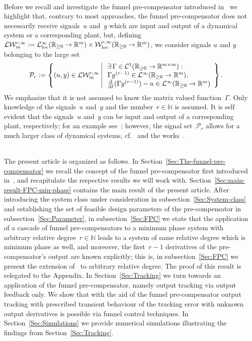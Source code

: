 \documentclass[ envcountsect, envcountsame]{svjour3}
\newcommand{\ddt}{\tfrac{\text{\normalfont d}}{\text{\normalfont d}t}}
\newcommand{\R}{\mathbb{R}}
\newcommand{\N}{\mathbb{N}}
\newcommand{\cC}{\mathcal{C}}
\newcommand{\cL}{\mathcal{L}}
\newcommand{\cP}{\mathcal{P}}
\newcommand{\cW}{\mathcal{W}}
\newcommand{\rp}{\mathbb{R}_{\geq 0}}
\begin{document}
\ \\
Before we recall and investigate the funnel pre-compensator introduced in~\cite{BergReis18b} we highlight that, contrary to most approaches, the funnel pre-compensator does not necessarily receive signals~$u$ and~$y$ which are input and output of a dynamical system or a corresponding plant, 
but, defining $\cL \cW_{m}^{r,\infty} := \cL_{\rm loc}^\infty(\rp \to \R^m) \times \cW_{\rm loc}^{r,\infty}(\rp \to \R^{m}) $, we consider signals $u$ and $y$ belonging to the large set
\begin{equation*}
\cP_r := 
\left\{ 
(u,y) \in \cL \cW_{m}^{r,\infty}  \ \vline \ 
\begin{array}{l}
\exists\, \Gamma \in \cC^1(\rp \to \R^{m \times m}): \\ 
\Gamma y^{(r-1)} \in \cL^\infty(\rp \to \R^m), \\
\ddt(\Gamma y^{(r-1)}) - u \in \cL^\infty(\rp \to \R^m)
\end{array}
\right\}.
\end{equation*}
We emphasize that it is not assumed to know the matrix valued function~$\Gamma$. 
Only knowledge of the signals~$u$ and~$y$ and the number~$ r \in \N$ is assumed.
It is self evident that the signals~$u$ and~$y$ can be input and output of a corresponding plant, respectively; for an example see~\cite{BergReis18b};
however, the signal set~$\cP_r$ allows for a much larger class of dynamical systems, cf.~\cite{BergLe18a} and the works~\cite{BergIlch14,IlchRyan02b}.


\ \\
The present article is organized as follows.
In Section~\ref{Sec:The-funnel-pre-compensator} we recall the concept of the funnel pre-compensator first introduced in~\cite{BergReis18b}, and recapitulate the respective results we will work with.
Section~\ref{Sec:main-result-FPC-min-phase} contains the main result of the present article. 
%
After introducing the system class under consideration in subsection~\ref{Sec:System-class} and establishing the set of feasible design parameters of the pre-compensator in subsection~\ref{Sec:Parameter}, 
%
in subsection~\ref{Sec:FPC} we state that the application of a cascade of funnel pre-compensators to a minimum phase system with arbitrary relative degree~$r \in \N$ leads to a system of same relative degree which is minimum phase as well, and moreover, the first~$r-1$ derivatives of the pre-compensator's output are known explicitly; this is, in subsection~\ref{Sec:FPC} we  present the extension of~\cite[Thm. 2]{BergReis18b} to arbitrary relative degree.
The proof of this result is relegated to the Appendix.
In Section~\ref{Sec:Tracking} we turn towards an application of the funnel pre-compensator, namely output tracking via output feedback only.
We show that with the aid of the funnel pre-compensator output tracking with prescribed transient behaviour of the tracking error with unknown output derivatives is possible via funnel control techniques.
In Section~\ref{Sec:Simulations} we provide numerical simulations illustrating the findings from Section~\ref{Sec:Tracking}.
\end{document}
